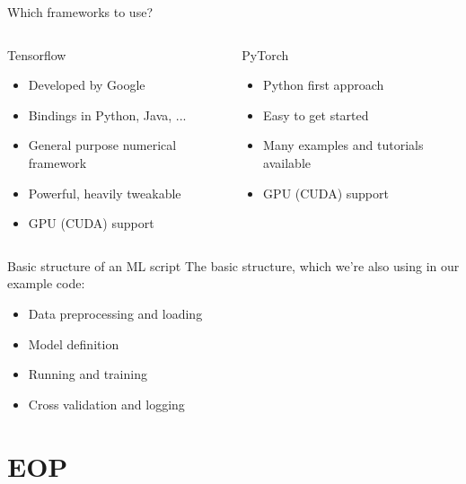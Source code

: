 \documentclass[aspectratio=169]{beamer}
\begin{document}
	\begin{frame}{Which frameworks to use?}
		\begin{columns}[T]
		    \begin{column}{.5\textwidth}
		    	\begin{block}{Tensorflow}
					\begin{itemize}
						\item Developed by Google
						\item Bindings in Python, Java, ...
						\item General purpose numerical framework
						\item Powerful, heavily tweakable
						\item GPU (CUDA) support
					\end{itemize}
		   		\end{block}
		    \end{column}
		    \begin{column}{.5\textwidth}
		    	\begin{block}{PyTorch}
		    		\begin{itemize}
						\item Python first approach
						\item Easy to get started
						\item Many examples and tutorials available
						\item GPU (CUDA) support
					\end{itemize}
		    	\end{block}
		    \end{column}
		  \end{columns}
	\end{frame}

	\begin{frame}{Basic structure of an ML script}
		The basic structure, which we're also using in our example code:
		\begin{itemize}
			\item Data preprocessing and loading
			\item Model definition
			\item Running and training
			\item Cross validation and logging
		\end{itemize}
	\end{frame}

\section{EOP}
\end{document}
